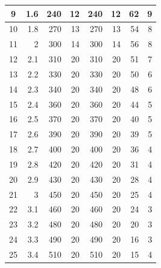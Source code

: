 \documentclass{article}
\begin{document}
\begin{table}[h!]
\begin{tabular}{|c|r|r|r|r|r|r|r|}
9                        & 1.6  & 240 & 12 & 240 & 12 & 62                     & 9                      \\ \hline
10                       & 1.8  & 270 & 13 & 270 & 13 & 54                     & 8                      \\ \hline
11                       & 2    & 300 & 14 & 300 & 14 & 56                     & 8                      \\ \hline
12                       & 2.1  & 310 & 20 & 310 & 20 & 51                     & 7                      \\ \hline
13                       & 2.2  & 330 & 20 & 330 & 20 & 50                     & 6                      \\ \hline
14                       & 2.3  & 340 & 20 & 340 & 20 & 48                     & 6                      \\ \hline
15                       & 2.4  & 360 & 20 & 360 & 20 & 44                     & 5                      \\ \hline
16                       & 2.5  & 370 & 20 & 370 & 20 & 40                     & 5                      \\ \hline
17                       & 2.6  & 390 & 20 & 390 & 20 & 39                     & 5                      \\ \hline
18                       & 2.7  & 400 & 20 & 400 & 20 & 36                     & 4                      \\ \hline
19                       & 2.8  & 420 & 20 & 420 & 20 & 31                     & 4                      \\ \hline
20                       & 2.9  & 430 & 20 & 430 & 20 & 28                     & 4                      \\ \hline
21                       & 3    & 450 & 20 & 450 & 20 & 25                     & 4                      \\ \hline
22                       & 3.1  & 460 & 20 & 460 & 20 & 24                     & 3                      \\ \hline
23                       & 3.2  & 480 & 20 & 480 & 20 & 20                     & 3                      \\ \hline
24                       & 3.3  & 490 & 20 & 490 & 20 & 16                     & 3                      \\ \hline
25                       & 3.4  & 510 & 20 & 510 & 20 & 15                     & 4                      \\ \hline

\end{tabular}
\end{table}
\end{document}
